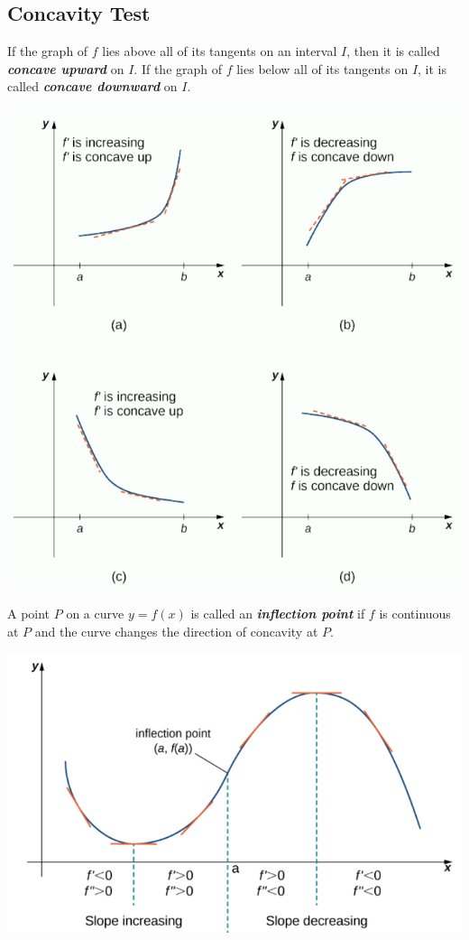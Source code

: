 \hypertarget{concavity-test}{%
\subsection{Concavity Test}\label{concavity-test}}

\begin{definition}

If the graph of \(f\) lies above all of its tangents on an interval
\(I\), then it is called \textbf{\emph{concave upward}} on \(I\). If the
graph of \(f\) lies below all of its tangents on \(I\), it is called
\textbf{\emph{concave downward}} on \(I\).

\begin{fullwidth}
  \centering
  \includegraphics[scale=0.6]{img/image-20200413135215226.png}
\end{fullwidth}

A point \(P\) on a curve \(y=f(x)\) is called an
\textbf{\emph{inflection point}} if \(f\) is continuous at \(P\) and the
curve changes the direction of concavity at \(P\).

\includegraphics[scale=0.4]{img/image-20200413135252785.png}

\end{definition}

